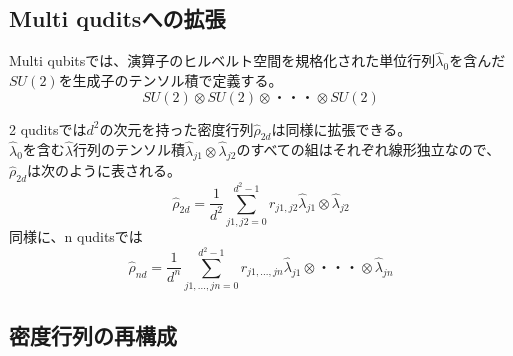 \documentclass[11pt,a4j,notitlepage]{jreport}
\begin{document}
	\subsection{Multi quditsへの拡張}

	Multi qubitsでは、演算子のヒルベルト空間を規格化された単位行列$\hat{\lambda}_0$を含んだ$SU(2)$を生成子のテンソル積で定義する。
	\begin{equation}
		SU(2) \otimes SU(2) \otimes ・・・ \otimes SU(2)
	\end{equation}

	2 quditsでは$d^2$の次元を持った密度行列$\hat{\rho}_{2 d}$は同様に拡張できる。\\
	$\hat{\lambda}_0$を含む$\hat{\lambda}$行列のテンソル積$\hat{\lambda}_{j 1} \otimes \hat{\lambda}_{j 2}$のすべての組はそれぞれ線形独立なので、$\hat{\rho}_{2 d}$は次のように表される。
	\begin{equation}
		\hat{\rho}_{2 d} = \frac{1}{d^2} \sum_{j1,j2=0}^{d^2 - 1} r_{j 1, j 2} \hat{\lambda}_{j 1} \otimes \hat{\lambda}_{j 2}
	\end{equation}
	同様に、n quditsでは
	\begin{equation}
		\hat{\rho}_{n d} = \frac{1}{d^n} \sum_{j1,...,jn=0}^{d^2 - 1} r_{j 1,...,j n} \hat{\lambda}_{j 1} \otimes ・・・ \otimes \hat{\lambda}_{j n}
	\end{equation}

	\subsection{密度行列の再構成}
\end{document}
